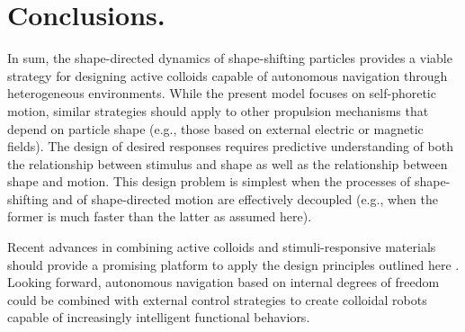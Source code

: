 \section{Conclusions.}  In sum, the shape-directed dynamics of shape-shifting particles provides a viable strategy for designing active colloids capable of autonomous navigation through heterogeneous environments.  While the present model focuses on self-phoretic motion, similar strategies should apply to other propulsion mechanisms that depend on particle shape (e.g., those based on external electric \cite{Ma2015} or magnetic \cite{Driscoll2017} fields).  The design of desired responses requires predictive understanding of both the relationship between stimulus and shape as well as the relationship  between shape and motion.  This design problem is simplest when the processes of shape-shifting and of shape-directed motion are effectively decoupled (e.g., when the former is much faster than the latter as assumed here). 

Recent advances in combining active colloids and stimuli-responsive materials should provide a promising platform to apply the design principles outlined here \cite{Alvarez2019}.  Looking forward, autonomous navigation based on internal degrees of freedom could be combined with external control strategies \cite{liebchen2019optimal} to create colloidal robots capable of increasingly intelligent functional behaviors.

